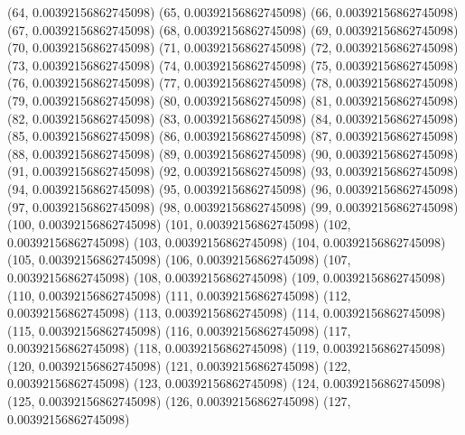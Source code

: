 \documentclass[12pt]{article}
\begin{document}
{                (64, 0.00392156862745098)
                (65, 0.00392156862745098)
                (66, 0.00392156862745098)
                (67, 0.00392156862745098)
                (68, 0.00392156862745098)
                (69, 0.00392156862745098)
                (70, 0.00392156862745098)
                (71, 0.00392156862745098)
                (72, 0.00392156862745098)
                (73, 0.00392156862745098)
                (74, 0.00392156862745098)
                (75, 0.00392156862745098)
                (76, 0.00392156862745098)
                (77, 0.00392156862745098)
                (78, 0.00392156862745098)
                (79, 0.00392156862745098)
                (80, 0.00392156862745098)
                (81, 0.00392156862745098)
                (82, 0.00392156862745098)
                (83, 0.00392156862745098)
                (84, 0.00392156862745098)
                (85, 0.00392156862745098)
                (86, 0.00392156862745098)
                (87, 0.00392156862745098)
                (88, 0.00392156862745098)
                (89, 0.00392156862745098)
                (90, 0.00392156862745098)
                (91, 0.00392156862745098)
                (92, 0.00392156862745098)
                (93, 0.00392156862745098)
                (94, 0.00392156862745098)
                (95, 0.00392156862745098)
                (96, 0.00392156862745098)
                (97, 0.00392156862745098)
                (98, 0.00392156862745098)
                (99, 0.00392156862745098)
                (100, 0.00392156862745098)
                (101, 0.00392156862745098)
                (102, 0.00392156862745098)
                (103, 0.00392156862745098)
                (104, 0.00392156862745098)
                (105, 0.00392156862745098)
                (106, 0.00392156862745098)
                (107, 0.00392156862745098)
                (108, 0.00392156862745098)
                (109, 0.00392156862745098)
                (110, 0.00392156862745098)
                (111, 0.00392156862745098)
                (112, 0.00392156862745098)
                (113, 0.00392156862745098)
                (114, 0.00392156862745098)
                (115, 0.00392156862745098)
                (116, 0.00392156862745098)
                (117, 0.00392156862745098)
                (118, 0.00392156862745098)
                (119, 0.00392156862745098)
                (120, 0.00392156862745098)
                (121, 0.00392156862745098)
                (122, 0.00392156862745098)
                (123, 0.00392156862745098)
                (124, 0.00392156862745098)
                (125, 0.00392156862745098)
                (126, 0.00392156862745098)
                (127, 0.00392156862745098)
            }
\end{document}
